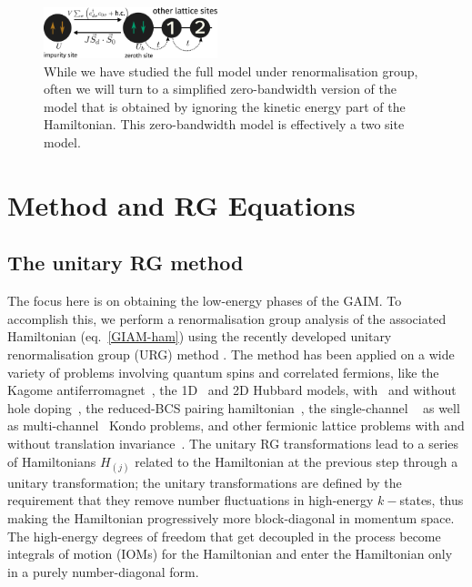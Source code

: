 \documentclass[reprint,superscriptaddress,floatfix]{revtex4-2}
\begin{document}
\begin{figure}[!htb]
	\centering
	\includegraphics[width=0.45\textwidth]{zeromode_bare.pdf}
	\caption{While we have studied the full model under renormalisation group, often we will turn to a simplified zero-bandwidth version of the model that is obtained by ignoring the kinetic energy part of the Hamiltonian. This zero-bandwidth model is effectively a two site model.}
	\label{zeromode-bare}
\end{figure}

\section{Method and RG Equations}
\label{method}

\subsection{The unitary RG method}
The focus here is on obtaining the low-energy phases of the GAIM. To accomplish this, we perform a renormalisation group analysis of the associated Hamiltonian (eq.~\ref{GIAM-ham}) using the recently developed unitary renormalisation group (URG) method \cite{anirbanurg1,anirbanurg2}. The method has been applied on a wide variety of problems involving quantum spins and correlated fermions, like the Kagome antiferromagnet~\cite{santanukagome}, the 1D~\cite{1dhubjhep} and 2D Hubbard models, with~\cite{anirbanmott2} and without hole doping~\cite{anirbanmott1}, the reduced-BCS pairing hamiltonian~\cite{siddharthacpi}, the single-channel ~\cite{anirban_kondo} as well as multi-channel~\cite{patra_mck} Kondo problems, and other fermionic lattice problems with and without translation invariance~\cite{anirbanurg1,anirbanurg2}. The unitary RG transformations lead to a series of Hamiltonians \(H_{(j)}\) related to the Hamiltonian at the previous step through a unitary transformation; the unitary transformations are defined by the requirement that they remove number fluctuations in high-energy \(k-\)states, thus making the Hamiltonian progressively more block-diagonal in momentum space. The high-energy degrees of freedom that get decoupled in the process become integrals of motion (IOMs) for the Hamiltonian and enter the Hamiltonian only in a purely number-diagonal form.
\end{document}
